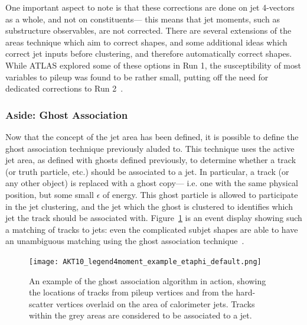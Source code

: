 One important aspect to note is that these corrections are done on jet 4-vectors as a whole, and not on constituents--- this means that jet moments, such as substructure observables, are not corrected. There are several extensions of the areas technique which aim to correct shapes, and some additional ideas which correct jet inputs before clustering, and therefore automatically correct shapes. While ATLAS explored some of these options in Run 1, the susceptibility of most variables to pileup was found to be rather small, putting off the need for dedicated corrections to Run 2~\cite{Soyez:2012hv,Berta:2014eza,Bertolini:2014bba}.



\subsubsection{Aside: Ghost Association}
\label{jet-reconstruction:pileup:ghost-association}

Now that the concept of the jet area has been defined, it is possible to define the ghost association technique previously aluded to. This technique uses the active jet area, as defined with ghosts defined previously, to determine whether a track (or truth particle, etc.) should be associated to a jet. In particular, a track (or any other object) is replaced with a ghost copy--- i.e. one with the same physical position, but some small $\epsilon$ of energy. This ghost particle is allowed to participate in the jet clustering, and the jet which the ghost is clustered to identifies which jet the track should be associated with. Figure~\ref{fig:jet-reconstruction:ghost} is an event display showing such a matching of tracks to jets: even the complicated subjet shapes are able to have an unambiguous matching using the ghost association technique~\cite{catchmentarea,ATLAS-SS-2011}.



\begin{figure}
\centering
\texttt{[image: AKT10\_legend4moment\_example\_etaphi\_default.png]}
\caption{An example of the ghost association algorithm in action, showing the locations of tracks from pileup vertices and from the hard-scatter vertices overlaid on the area of calorimeter jets. Tracks within the grey areas are considered to be associated to a jet.}
\label{fig:jet-reconstruction:ghost}
\end{figure}




